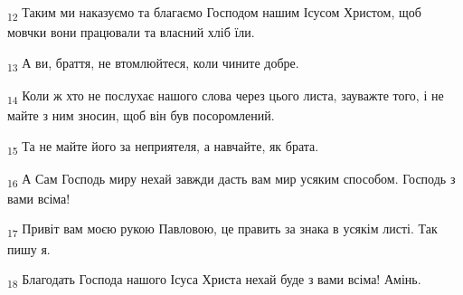 \begin{tcolorbox}
\textsubscript{12} Таким ми наказуємо та благаємо Господом нашим Ісусом Христом, щоб мовчки вони працювали та власний хліб їли.
\end{tcolorbox}
\begin{tcolorbox}
\textsubscript{13} А ви, браття, не втомлюйтеся, коли чините добре.
\end{tcolorbox}
\begin{tcolorbox}
\textsubscript{14} Коли ж хто не послухає нашого слова через цього листа, зауважте того, і не майте з ним зносин, щоб він був посоромлений.
\end{tcolorbox}
\begin{tcolorbox}
\textsubscript{15} Та не майте його за неприятеля, а навчайте, як брата.
\end{tcolorbox}
\begin{tcolorbox}
\textsubscript{16} А Сам Господь миру нехай завжди дасть вам мир усяким способом. Господь з вами всіма!
\end{tcolorbox}
\begin{tcolorbox}
\textsubscript{17} Привіт вам моєю рукою Павловою, це править за знака в усякім листі. Так пишу я.
\end{tcolorbox}
\begin{tcolorbox}
\textsubscript{18} Благодать Господа нашого Ісуса Христа нехай буде з вами всіма! Амінь.
\end{tcolorbox}
